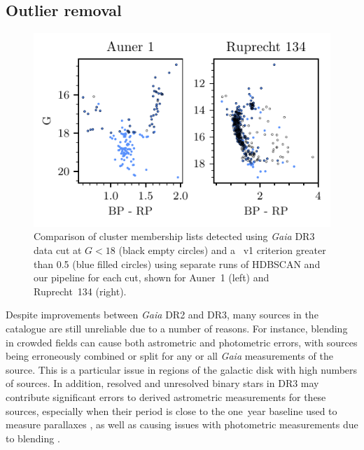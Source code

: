 

\subsection{Outlier removal}\label{c3:sec:data:outliers}

\begin{figure}[t]
   \centering
   \includegraphics[width=\textwidth]{fig/c3/fig_data_cut_comparison.pdf}
   \caption[Comparison of cluster membership lists detected using \emph{Gaia} DR3 data cut at $G<18$ and a \cite{rybizki_classifier_2022}~v1 criterion greater than 0.5]{Comparison of cluster membership lists detected using \emph{Gaia} DR3 data cut at $G<18$ (black empty circles) and a \cite{rybizki_classifier_2022}~v1 criterion greater than 0.5 (blue filled circles) using separate runs of HDBSCAN and our pipeline for each cut, shown for Auner~1 (left) and Ruprecht~134 (right).}%
   \label{c3:fig:cut_comparison}
\end{figure}

Despite improvements between \emph{Gaia} DR2 and DR3, many sources in the catalogue are still unreliable due to a number of reasons. For instance, blending in crowded fields can cause both astrometric and photometric errors, with sources being erroneously combined or split for any or all \emph{Gaia} measurements of the source. This is a particular issue in regions of the galactic disk with high numbers of sources. In addition, resolved and unresolved binary stars in DR3 may contribute significant errors to derived astrometric measurements for these sources, especially when their period is close to the one~year baseline used to measure parallaxes \citep{penoyre_astrometric_2022, lindegren_gaia_2021-1}, as well as causing issues with photometric measurements due to blending \citep{riello_gaia_2021, golovin_fifth_2023}.

